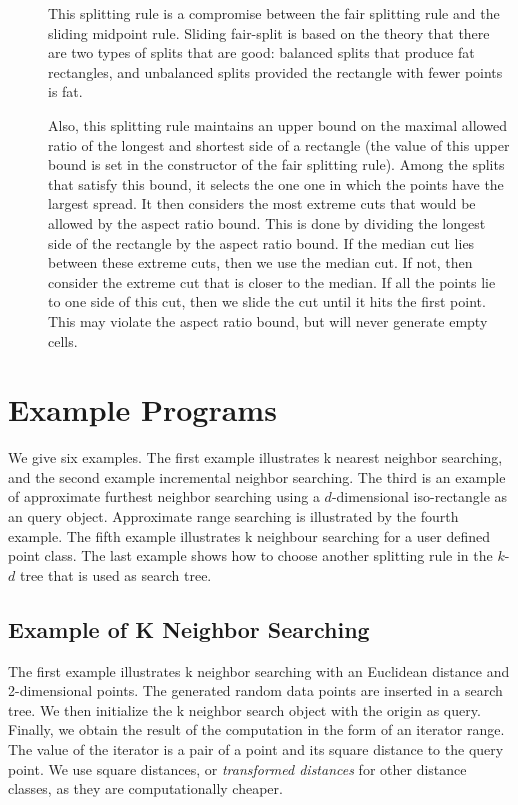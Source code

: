 \begin{description}
\item[ ]

This splitting rule is a compromise between the fair splitting rule
and the sliding midpoint rule.  Sliding fair-split is based on the
theory that there are two types of splits that are good: balanced
splits that produce fat rectangles, and unbalanced splits provided the
rectangle with fewer points is fat.

Also, this splitting rule maintains an upper bound on the maximal
allowed ratio of the longest and shortest side of a rectangle (the
value of this upper bound is set in the constructor of the fair
splitting rule). Among the splits that satisfy this bound, it selects
the one one in which the points have the largest spread.  It then
considers the most extreme cuts that would be allowed by the aspect
ratio bound. This is done by dividing the longest side of the
rectangle by the aspect ratio bound. If the median cut lies between
these extreme cuts, then we use the median cut. If not, then consider
the extreme cut that is closer to the median.  If all the points lie
to one side of this cut, then we slide the cut until it hits the first
point.  This may violate the aspect ratio bound, but will never
generate empty cells.

\end{description}




\section{Example Programs}

We give six examples.  The first example illustrates k nearest neighbor
searching, and the second example incremental neighbor searching. 
The third is an example of approximate furthest neighbor searching
using a $d$-dimensional iso-rectangle as an query object.  Approximate
range searching is illustrated by the fourth example.  The fifth
example illustrates k neighbour searching for a user defined point
class. The last example shows how to choose another splitting rule in the
$k$-$d$ tree that is used as search tree.

\newpage
\subsection{Example of K Neighbor Searching}

The first example illustrates k neighbor searching with an Euclidean
distance and 2-dimensional points. The generated random
data points are inserted in a search tree. We then initialize
the k neighbor search object with the origin as query. Finally, we 
obtain the result of the computation in the form of an iterator
range. The value of the iterator is a pair of a point and its square
distance to the query point. We use square distances, or {\em
transformed distances} for other distance classes, as they are 
computationally cheaper.

